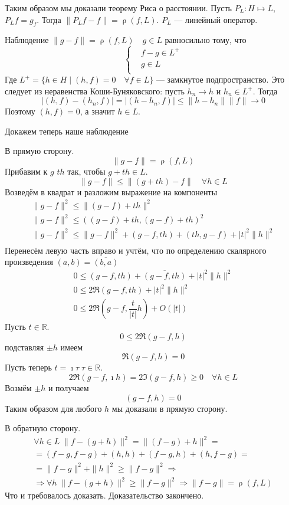 \documentclass[14pt]{extarticle}
\DeclareMathOperator{\rh}{\rho}
\begin{document}
Таким образом мы доказали теорему Риса о расстоянии.
Пусть $P_L : H \mapsto L$, $P_L f = g_f$.
Тогда $\|P_Lf - f\| = \rh(f, L)$. $P_L$ --- линейный оператор.
\begin{MathCl}{Наблюдение}
	$\|g - f\| = \rh(f, L)\quad g \in L$ равносильно тому, что 
	$$
	\left\{
		\begin{aligned}
			&f - g \in L^{+}\\
        	&g \in L\\
    	\end{aligned}
	\right.
	$$
	Где $L^+ = \{h \in H \mid (h, f) = 0 \quad \forall f \in L\}$ --- замкнутое подпространство.
	Это следует из неравенства Коши-Буняковского: пусть $h_n \to h$ и $h_n \in L^+$.
	Тогда
	$$
	|(h, f) - (h_n, f)| = |(h - h_n, f)| \le \|h - h_n\| \|f\|\to 0
	$$
	Поэтому $(h, f)=0$, а значит $h \in L$.
\end{MathCl}
Докажем теперь наше наблюдение
\begin{Proof}
    В прямую сторону.
    $$
    \|g - f\| = \rh(f, L)
    $$
    Прибавим к $g$ $th$ так, чтобы $g + th \in L$.
    $$
    \|g - f\| \le \|(g + t h) - f\| \quad \forall h \in L
    $$
    Возведём в квадрат и разложим выражение на компоненты
    \begin{gather*}
        \|g - f\|^2 \le \|(g - f) + t h\|^2\\
        \|g - f\|^2 \le ((g - f) + t h, (g - f) + t h)^2\\
        \|g - f\|^2 \le \|g - f\|^2 + (g - f, t h) + (t h, g - f) + |t|^2 \|h\|^2\\
	\end{gather*}
	Перенесём левую часть вправо и учтём, что по определению скалярного произведения $(a, b) = \overline{(b, a)}$
	\begin{gather*}
        0 \le (g - f, t h) + \overline{(g - f, t h)} + |t|^2 \|h\|^2\\ 
        0 \le 2\Re(g - f,t h) + |t|^2 \|h\|^2\\
        0 \le 2\Re(g - f, \dfrac{t}{|t|} h) + O(|t|)
	\end{gather*}
    Пусть $t \in \mathbb R$.
    $$
    0 \le 2\Re(g - f, h)
    $$
    подставляя $\pm h$ имеем
    $$
    \Re(g - f, h) = 0
    $$
    Пусть теперь $t = \imath \tau\; \tau \in \mathbb R$.
    $$
    2\Re(g - f, \imath h) = 2\Im(g - f, h) \ge 0\quad\forall h \in L
    $$
    Возмём $\pm h$ и получаем
    $$
    (g - f, h) = 0
    $$
    Таким образом для любого $h$ мы доказали в прямую сторону.
    
    В обратную сторону.
    \begin{multline*}
    \forall h \in L\;\|f - (g + h)\|^2 = \|(f - g) + h\|^2 =\\
     = (f - g, f - g) + (h, h) + (f - g, h) + (h, f - g) =\\
    = \|f - g\|^2+\|h\|^2 \ge \|f - g\|^2 \Rightarrow \\
    \Rightarrow \forall h\;\|f - (g + h)\|^2 \ge \|f - g\|^2 \Rightarrow \|f - g\| = \rh(f, L)
    \end{multline*}
    Что и требовалось доказать.
    Доказательство закончено.
\end{Proof}
\end{document}
